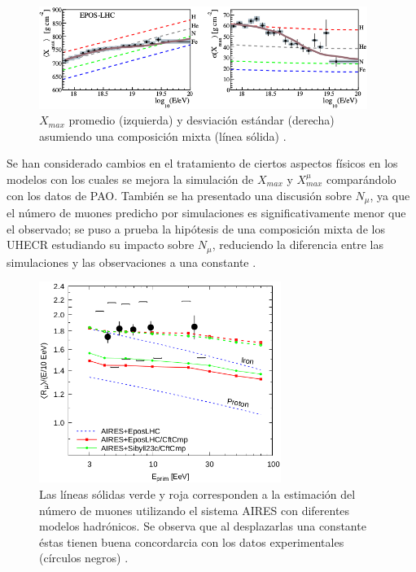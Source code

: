 \begin{figure}[h]
\centering
\includegraphics[width=0.95\textwidth]{Figuras/Xmax_PAO} 
\caption{$X_{max}$ promedio (izquierda) y desviación estándar (derecha) asumiendo una composición mixta (línea sólida) \cite{PAOcomposition}.}
\label{fig:Xmax}
\end{figure}	

Se han considerado cambios en el tratamiento de ciertos aspectos físicos en los modelos \cite{Ostapchenko2019} con los cuales se mejora la simulación de $X_{max}$ y $X_{max}^{\mu}$ comparándolo con los datos de PAO. También se ha presentado una discusión sobre $N_{\mu}$, ya que el número de muones predicho por simulaciones es significativamente menor que el observado; se puso a prueba la hipótesis de una composición mixta de los UHECR estudiando su impacto sobre $N_{\mu}$, reduciendo la diferencia entre las simulaciones y las observaciones a una constante \cite{Sciutto2019}.

\begin{figure}[h]
\centering
\includegraphics[width=0.7\textwidth]{Figuras/Nmu_Sciutto} 
\caption{Las líneas sólidas verde y roja corresponden a la estimación del número de muones utilizando el sistema AIRES con diferentes modelos hadrónicos. Se observa que al desplazarlas una constante éstas tienen buena concordarcia con los datos experimentales (círculos negros) \cite{Sciutto2019}.}
\label{fig:Nmu}
\end{figure}	

\singlespace


